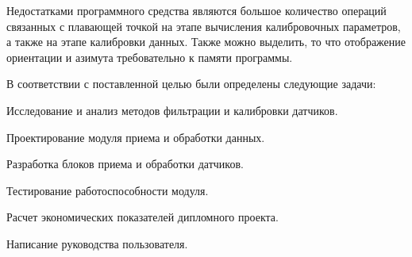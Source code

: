 Недостатками программного средства являются большое количество операций связанных с плавающей точкой на этапе вычисления калибровочных параметров,
а также на этапе калибровки данных. Также можно выделить, то что отображение ориентации и азимута требовательно к памяти программы.   

В соответствии с поставленной целью были определены следующие задачи:
\begin{enumerate_num}
    \item Исследование и анализ методов фильтрации и калибровки датчиков.
    \item Проектирование модуля приема и обработки данных.
    \item Разработка блоков приема и обработки датчиков.
    \item Тестирование работоспособности модуля.
    \item Расчет экономических показателей дипломного проекта.
    \item Написание руководства пользователя.
\end{enumerate_num}
